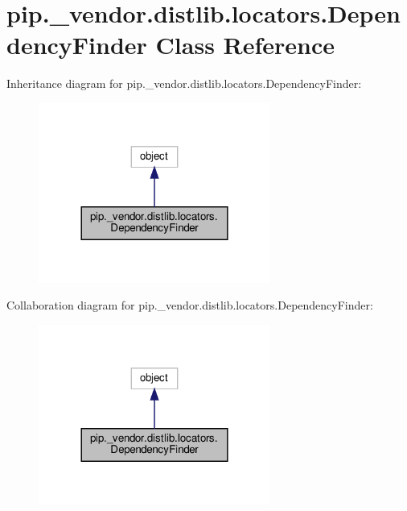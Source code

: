 \hypertarget{classpip_1_1__vendor_1_1distlib_1_1locators_1_1DependencyFinder}{}\section{pip.\+\_\+vendor.\+distlib.\+locators.\+Dependency\+Finder Class Reference}
\label{classpip_1_1__vendor_1_1distlib_1_1locators_1_1DependencyFinder}


Inheritance diagram for pip.\+\_\+vendor.\+distlib.\+locators.\+Dependency\+Finder\+:
\nopagebreak
\begin{figure}[H]
\begin{center}
\leavevmode
\includegraphics[width=216pt]{classpip_1_1__vendor_1_1distlib_1_1locators_1_1DependencyFinder__inherit__graph}
\end{center}
\end{figure}


Collaboration diagram for pip.\+\_\+vendor.\+distlib.\+locators.\+Dependency\+Finder\+:
\nopagebreak
\begin{figure}[H]
\begin{center}
\leavevmode
\includegraphics[width=216pt]{classpip_1_1__vendor_1_1distlib_1_1locators_1_1DependencyFinder__coll__graph}
\end{center}
\end{figure}
